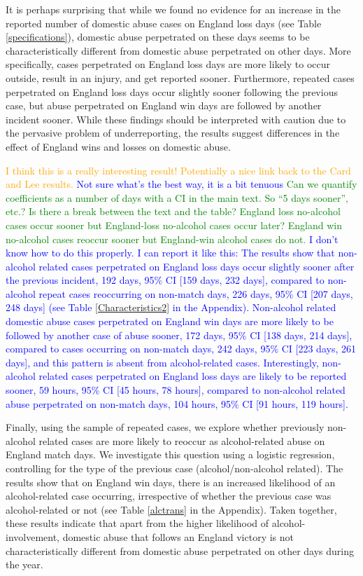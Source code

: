\documentclass[12pt, letterpaper]{article}
\newcommand{\NS}[1] {{\textcolor{green}{#1}}}
\newcommand{\TM}[1] {{\textcolor{orange}{#1}}}
\newcommand{\AT}[1] {{\textcolor{blue}{#1}}}
\begin{document}
It is perhaps surprising that while we found no evidence for an increase in the reported number of domestic abuse cases on England loss days (see Table \ref{specifications}), domestic abuse perpetrated on these days seems to be characteristically different from domestic abuse perpetrated on other days. More specifically, cases perpetrated on England loss days are more likely to occur outside, result in an injury, and get reported sooner. Furthermore, repeated cases perpetrated on England loss days occur slightly sooner following the previous case, but abuse perpetrated on England win days are followed by another incident sooner. While these findings should be interpreted with caution due to the pervasive problem of underreporting, the results suggest differences in the effect of England wins and losses on domestic abuse.

 \TM{I think this is a really interesting result! Potentially a nice link back to the Card and Lee results.} \AT{Not sure what's the best way, it is a bit tenuous} \NS{Can we quantify coefficients as a number of days with a CI in the main text. So ``5 days sooner'', etc.? }\NS{Is there a break between the text and the table? England loss no-alcohol cases occur sooner but England-loss no-alcohol cases occur later? England win no-alcohol cases reoccur sooner but England-win alcohol cases do not.} \AT{I don't know how to do this properly. I can report it like this: The results show that non-alcohol related cases perpetrated on England loss days occur slightly sooner after the previous incident, 192 days, 95\% CI [159 days, 232 days], compared to non-alcohol repeat cases reoccurring on non-match days, 226 days, 95\% CI [207 days, 248 days] (see Table \ref{Characteristics2} in the Appendix). Non-alcohol related domestic abuse cases perpetrated on England win days are more likely to be followed by another case of abuse sooner, 172 days, 95\% CI [138 days, 214 days], compared to cases occurring on non-match days, 242 days, 95\% CI [223 days, 261 days], and this pattern is absent from alcohol-related cases. Interestingly, non-alcohol related cases perpetrated on England loss days are likely to be reported sooner, 59 hours, 95\% CI [45 hours, 78 hours], compared to non-alcohol related abuse perpetrated on non-match days, 104 hours, 95\% CI [91 hours, 119 hours].}

Finally, using the sample of repeated cases, we explore whether previously non-alcohol related cases are more likely to reoccur as alcohol-related abuse on England match days. We investigate this question using a logistic regression, controlling for the type of the previous case (alcohol/non-alcohol related). The results show that on England win days, there is an increased likelihood of an alcohol-related case occurring, irrespective of whether the previous case was alcohol-related or not (see Table \ref{alctrans} in the Appendix). Taken together, these results indicate that apart from the higher likelihood of alcohol-involvement, domestic abuse that follows an England victory is not characteristically different from domestic abuse perpetrated on other days during the year. 
\end{document}
